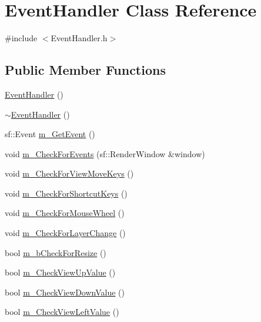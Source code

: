 \hypertarget{class_event_handler}{}\section{Event\+Handler Class Reference}
\label{class_event_handler}


{\ttfamily \#include $<$Event\+Handler.\+h$>$}

\subsection*{Public Member Functions}
\begin{DoxyCompactItemize}
\item 
\mbox{\hyperlink{class_event_handler_a8fe27b69582cce5c6a89a0b134bc8158}{Event\+Handler}} ()
\item 
\mbox{\hyperlink{class_event_handler_a3decb8cd88ba8af2b9b0b0f0f2fcd722}{$\sim$\+Event\+Handler}} ()
\item 
sf\+::\+Event \mbox{\hyperlink{class_event_handler_a829677a604aaea61fc54cf4089e71f7e}{m\+\_\+\+Get\+Event}} ()
\item 
void \mbox{\hyperlink{class_event_handler_aefee97f1023fa4c34300ea178dd5deea}{m\+\_\+\+Check\+For\+Events}} (sf\+::\+Render\+Window \&window)
\item 
void \mbox{\hyperlink{class_event_handler_a0581a3933c661149686c55627dbe4d66}{m\+\_\+\+Check\+For\+View\+Move\+Keys}} ()
\item 
void \mbox{\hyperlink{class_event_handler_adedb9cd9c88226c94ba058f9b62ffc43}{m\+\_\+\+Check\+For\+Shortcut\+Keys}} ()
\item 
void \mbox{\hyperlink{class_event_handler_a8bfcf6b8fbb8b1a02a9b2c1c58ace093}{m\+\_\+\+Check\+For\+Mouse\+Wheel}} ()
\item 
void \mbox{\hyperlink{class_event_handler_ae52d4e698f5075d4e4acf513db73b0fb}{m\+\_\+\+Check\+For\+Layer\+Change}} ()
\item 
bool \mbox{\hyperlink{class_event_handler_a1d34711a647402ca6171e6e90e86bc3e}{m\+\_\+b\+Check\+For\+Resize}} ()
\item 
bool \mbox{\hyperlink{class_event_handler_a87009934f0c1033e353fd4b3f6851125}{m\+\_\+\+Check\+View\+Up\+Value}} ()
\item 
bool \mbox{\hyperlink{class_event_handler_aec4484cb379a011f0a22d0ec851bd062}{m\+\_\+\+Check\+View\+Down\+Value}} ()
\item 
bool \mbox{\hyperlink{class_event_handler_a95b4da119b401c5ff583a4d2ba2cc9f6}{m\+\_\+\+Check\+View\+Left\+Value}} ()

\end{DoxyCompactItemize}
